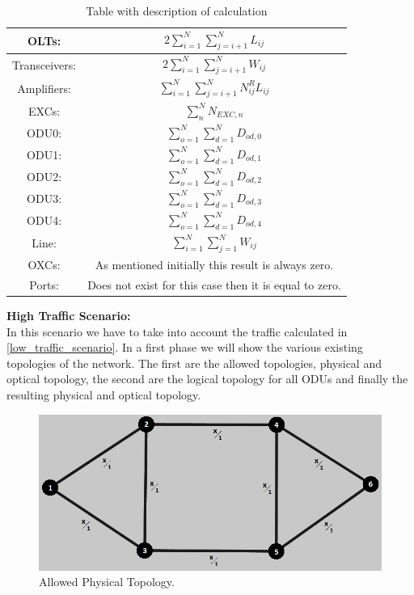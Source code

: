 \begin{table}[H]
\centering
\begin{tabular}{|| c | c ||}
 \hline
 OLTs: & \(\displaystyle 2 \sum_{i=1}^{N}\sum_{j=i+1}^{N} L_{ij} \) \\ \hline
 Transceivers: & \(\displaystyle 2 \sum_{i=1}^{N}\sum_{j=i+1}^{N} W_{ij} \) \\ \hline
 Amplifiers: & \(\displaystyle \sum_{i=1}^{N}\sum_{j=i+1}^{N} N^R_{ij} L_{ij} \) \\ \hline
 EXCs: & \(\displaystyle \sum_n^N N_{EXC,n} \) \\ \hline
 ODU0: & \(\displaystyle \sum_{o=1}^{N}\sum_{d=1}^{N} D_{od,0} \) \\ \hline
 ODU1: & \(\displaystyle \sum_{o=1}^{N}\sum_{d=1}^{N} D_{od,1} \) \\ \hline
 ODU2: & \(\displaystyle \sum_{o=1}^{N}\sum_{d=1}^{N} D_{od,2} \)\\ \hline
 ODU3: & \(\displaystyle \sum_{o=1}^{N}\sum_{d=1}^{N} D_{od,3} \) \\ \hline
 ODU4: & \(\displaystyle \sum_{o=1}^{N}\sum_{d=1}^{N} D_{od,4} \) \\ \hline
 Line: & \(\displaystyle \sum_{i=1}^{N}\sum_{j=1}^{N} W_{ij} \) \\ \hline
 OXCs: & As mentioned initially this result is always zero. \\ \hline
 Ports: & Does not exist for this case then it is equal to zero. \\
 \hline
 \end{tabular}
\caption{Table with description of calculation}
\label{formulas_opaque_protec_ref_medium_heuristic}
\end{table}

\textbf{High Traffic Scenario:}\\

In this scenario we have to take into account the traffic calculated in \ref{low_traffic_scenario}. In a first phase we will show the various existing topologies of the network. The first are the allowed topologies, physical and optical topology, the second are the logical topology for all ODUs and finally the resulting physical and optical topology.\\

\begin{figure}[H]
\centering
\includegraphics[width=13cm]{sdf/heuristic/figures/topologies/opaque_protec/high/allowed_physical_high}
\caption{Allowed Physical Topology.}
\label{allowed_physical_protec_ref_high_heuristic}
\end{figure}

